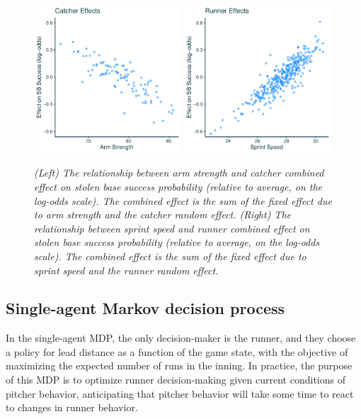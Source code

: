 \documentclass{article}
\begin{document}
      \begin{figure}
        \centering
        \includegraphics[width = 0.49\textwidth]{../../output/figures/effect_catcher_light.pdf}
        \includegraphics[width = 0.49\textwidth]{../../output/figures/effect_runner_light.pdf}
        \caption{
          \it
          (Left) The relationship between arm strength and catcher combined effect on stolen base success probability (relative to average, on the log-odds scale). The combined effect is the sum of the fixed effect due to arm strength and the catcher random effect.
          (Right) The relationship between sprint speed and runner combined effect on stolen base success probability (relative to average, on the log-odds scale). The combined effect is the sum of the fixed effect due to sprint speed and the runner random effect.
        }
        \label{fig:random-effect}
      \end{figure}

    \subsection{Single-agent Markov decision process}

      In the single-agent MDP, the only decision-maker is the runner, and they choose a policy for lead distance as a function of the game state, with the objective of maximizing the expected number of runs in the inning. In practice, the purpose of this MDP is to optimize runner decision-making given current conditions of pitcher behavior, anticipating that pitcher behavior will take some time to react to changes in runner behavior.
\end{document}
